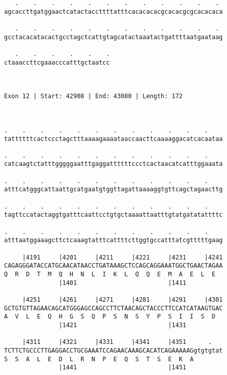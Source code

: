 \documentclass{article}
\begin{document}
\begin{Verbatim}
   .    .    .    .    .    .    .    .    .    .    .    . 
agcaccttgatggaactcatactaccttttatttcacacacacgcacacgcgcacacaca
                                                            
   .    .    .    .    .    .    .    .    .    .    .    . 
gcctacacatacactgcctagctcattgtagcatactaaatactgattttaatgaataag
                                                            
   .    .    .    .    .    .
ctaaaccttcgaaacccatttgctaatcc
                             
                             
 
Exon 12 | Start: 42908 | End: 43080 | Length: 172



.    .    .    .    .    .    .    .    .    .    .    .    
tattttttcactccctagctttaaaagaaaataaccaacttcaaaaggacatcacaataa
                                                            
.    .    .    .    .    .    .    .    .    .    .    .    
catcaagtctatttgggggaatttgaggattttttccctcactaacatcatttggaaata
                                                            
.    .    .    .    .    .    .    .    .    .    .    .    
atttcatgggcattaattgcatgaatgtggttagattaaaaggtgttcagctagaacttg
                                                            
.    .    .    .    .    .    .    .    .    .    .    .    
tagttccatactaggtgatttcaattcctgtgctaaaattaatttgtatgatatattttc
                                                            
.    .    .    .    .    .    .    .    .    .    .    .    
atttaatggaaagcttctcaaagtatttcattttcttggtgccatttatcgtttttgaag
                                                            
     |4191     |4201     |4211     |4221     |4231     |4241
CAGAGGGATACCATGCAACATAACCTGATAAAGCTCCAGCAGGAAATGGCTGAACTAGAA
Q  R  D  T  M  Q  H  N  L  I  K  L  Q  Q  E  M  A  E  L  E  
               |1401                         |1411          
  
     |4251     |4261     |4271     |4281     |4291     |4301
GCTGTGTTAGAACAGCATGGGAGCCAGCCTTCTAACAGCTACCCTTCCATCATAAGTGAC
A  V  L  E  Q  H  G  S  Q  P  S  N  S  Y  P  S  I  I  S  D  
               |1421                         |1431          
  
     |4311     |4321     |4331     |4341     |4351      .   
TCTTCTGCCCTTGAGGACCTGCGAAATCCAGAACAAAGCACATCAGAAAAAGgtgtgtat
S  S  A  L  E  D  L  R  N  P  E  Q  S  T  S  E  K  A        
               |1441                         |1451          
  

\end{Verbatim}
\end{document}
